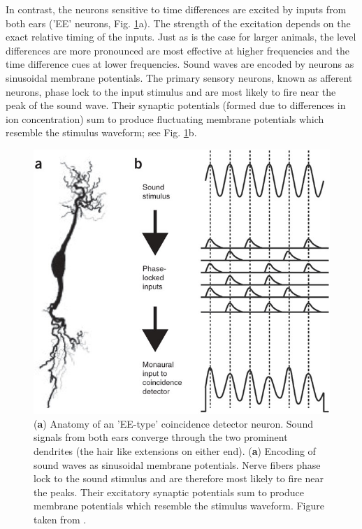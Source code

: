 \documentclass[12pt]{book}
\begin{document}
In contrast, the neurons sensitive to time differences are excited by inputs from both ears ('EE' neurons, Fig. \ref{EEtypedetector}a). The strength of the
excitation depends on the exact relative timing of the inputs. Just as is the case for larger animals, the level
differences are more pronounced are most effective at higher frequencies and the time difference cues at lower frequencies. Sound waves are encoded
by neurons as sinusoidal membrane potentials. The primary sensory neurons, known as afferent neurons, phase lock to the input
stimulus and are most likely to fire near the peak of the sound wave. Their synaptic potentials (formed due to differences
in ion concentration) sum to produce fluctuating membrane potentials which resemble the stimulus waveform; see Fig. \ref{EEtypedetector}b. 
\begin{figure}[ht!]
 \centering
 \includegraphics[width=0.7\linewidth]{Diagrams/EEtypedetector.jpg}
 \caption[EE-type coincidence detector and encoding of sound waves as membrane potentials.]{(\textbf{a}) Anatomy of an 'EE-type'
 coincidence detector neuron. Sound signals from both ears converge through the two prominent dendrites (the hair like extensions
 on either end). (\textbf{a}) Encoding of sound waves as sinusoidal membrane potentials. Nerve fibers phase lock to the sound stimulus and
 are therefore most likely to fire near the peaks. Their excitatory synaptic potentials sum to produce membrane potentials which resemble the
 stimulus waveform. Figure taken from \cite{schnuppcarr}.}
 \label{EEtypedetector}
\end{figure}
\end{document}
